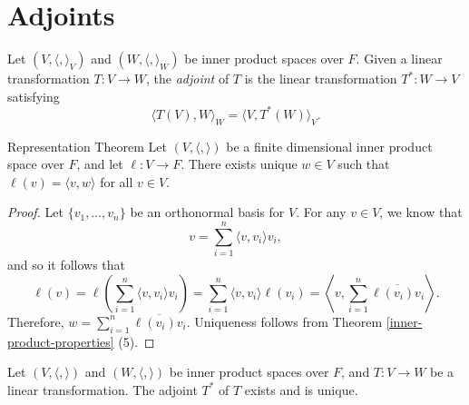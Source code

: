 \section{Adjoints}

\begin{defn}
    Let $(V, \langle, \rangle_V)$ and $(W, \langle, \rangle_W)$ be inner product spaces over $F$. Given a linear transformation $T: V \to W$, the \emph{adjoint} of $T$ is the linear transformation $T^{*}: W \to V$ satisfying \[\langle T(V), W\rangle_W = \langle V, T^{*}(W)\rangle_V.\]
\end{defn}

\begin{lemma}Representation Theorem\label{adjoint-representation-theorem}\proofbreak
    Let $(V, \langle,\rangle)$ be a finite dimensional inner product space over $F$, and let $\ell: V \to F$. There exists unique $w \in V$ such that $\ell(v) = \langle v, w \rangle$ for all $v \in V$.
\end{lemma}

\begin{proof}
    Let $\{v_1, \ldots, v_n\}$ be an orthonormal basis for $V$. For any $v \in V$, we know that
    \[v = \sum_{i=1}^{n}\langle v, v_i \rangle v_i,\]
    and so it follows that
    \[\ell(v) = \ell\left(\sum_{i=1}^{n}\langle v, v_i \rangle v_i\right) = \sum_{i=1}^{n}\langle v, v_i \rangle \ell(v_i) = \left\langle v, \sum_{i=1}^{n}\overline{\ell(v_i)v_i} \right\rangle.\]
    Therefore, $w = \sum_{i=1}^{n}\overline{\ell(v_i)v_i}$. Uniqueness follows from Theorem \ref{inner-product-properties} (5).
\end{proof}

\begin{thm}\label{adjoint-existence-uniqueness}
    Let $(V, \langle, \rangle)$ and $(W, \langle, \rangle)$ be inner product spaces over $F$, and $T: V \to W$ be a linear transformation. The adjoint $T^*$ of $T$ exists and is unique.
\end{thm}

